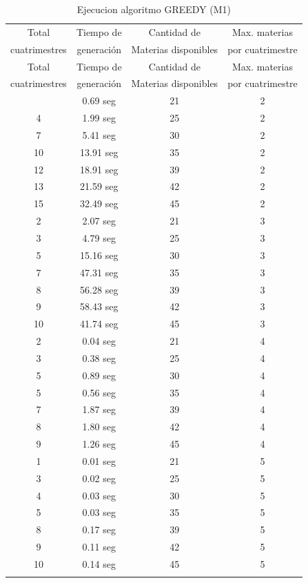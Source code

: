 \documentclass[a4paper]{article}
\begin{document}
\begin{longtable}{| c | c | c | c |}
\hline
Total   & Tiempo de & Cantidad de & Max. materias  \\
cuatrimestres &  generación &  Materias disponibles & por cuatrimestre \\
\hline \hline
\endfirsthead
\hline
Total   & Tiempo de & Cantidad de & Max. materias  \\
cuatrimestres &  generación &  Materias disponibles & por cuatrimestre \\
\hline \hline
\endhead
\endfoot
\endlastfoot
2 & 0.69 seg & 21 & 2\\
\hline
4 & 1.99 seg & 25 & 2\\
\hline
7 & 5.41 seg & 30 & 2\\
\hline
10 & 13.91 seg & 35 & 2\\
\hline
12 & 18.91 seg & 39 & 2\\
\hline
13 & 21.59 seg & 42 & 2\\
\hline
15 & 32.49 seg & 45 & 2\\
\hline
2 & 2.07 seg & 21 & 3\\
\hline
3 & 4.79 seg & 25 & 3\\
\hline
5 & 15.16 seg & 30 & 3\\
\hline
7 & 47.31 seg & 35 & 3\\
\hline
8 & 56.28 seg & 39 & 3\\
\hline
9 & 58.43 seg & 42 & 3\\
\hline
10 & 41.74 seg & 45 & 3\\
\hline
2 & 0.04 seg & 21 & 4\\
\hline
3 & 0.38 seg & 25 & 4\\
\hline
5 & 0.89 seg & 30 & 4\\
\hline
5 & 0.56 seg & 35 & 4\\
\hline
7 & 1.87 seg & 39 & 4\\
\hline
8 & 1.80 seg & 42 & 4\\
\hline
9 & 1.26 seg & 45 & 4\\
\hline
1 & 0.01 seg & 21 & 5\\
\hline
3 & 0.02 seg & 25 & 5\\
\hline
4 & 0.03 seg & 30 & 5\\
\hline
5 & 0.03 seg & 35 & 5\\
\hline
8 & 0.17 seg & 39 & 5\\
\hline
9 & 0.11 seg & 42 & 5\\
\hline
10 & 0.14 seg & 45 & 5\\
\hline
\caption{Ejecucion algoritmo GREEDY (M1)}
\end{longtable}
\end{document}
